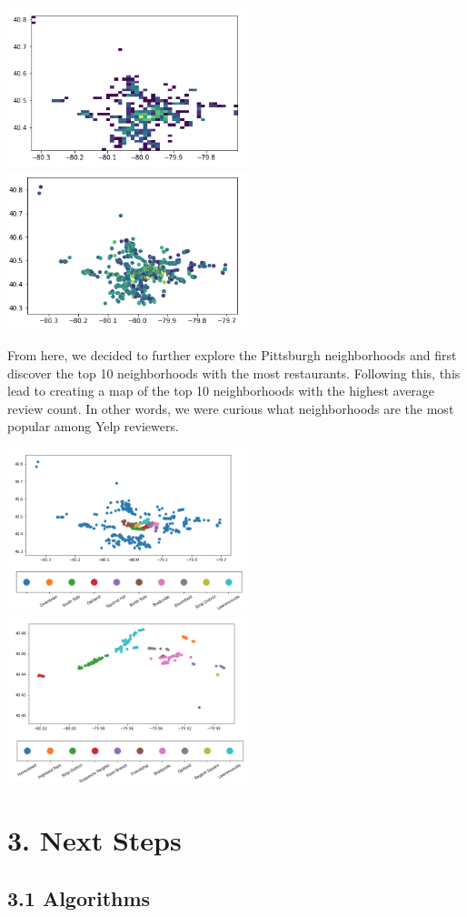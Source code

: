 \documentclass{neu_handout}
\begin{document}
\begin{center}
\includegraphics[width=70mm,scale=0.5]{pa_rest_density}
\includegraphics[width=70mm,scale=0.5]{pa_popular_restaurants}
\end{center}

From here, we decided to further explore the Pittsburgh neighborhoods and first discover the top 10 neighborhoods with the most restaurants. Following this, this lead to creating a map of the top 10 neighborhoods with the highest average review count. In other words, we were curious what neighborhoods are the most popular among Yelp reviewers.

\begin{center}
\includegraphics[width=70mm,scale=0.5]{pitts_hoods_most_restaurants}
\includegraphics[width=70mm,scale=0.5]{top_10_most_popular_neighborhoods}
\end{center}

\section*{3. Next Steps}

\subsection*{3.1 Algorithms}
\end{document}
